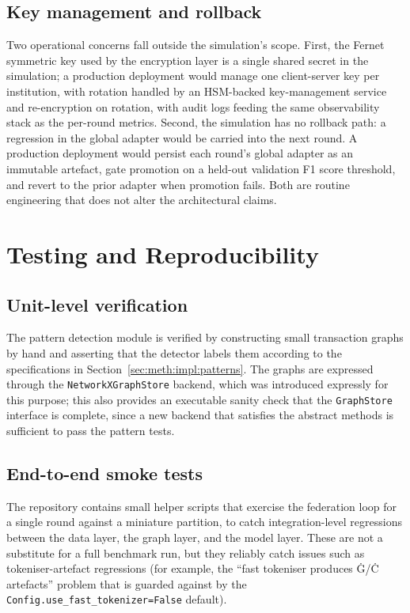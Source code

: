 \documentclass{report}
\begin{document}
\subsection{Key management and rollback}

Two operational concerns fall outside the simulation's scope. First, the Fernet symmetric key used by the encryption layer is a single shared secret in the simulation; a production deployment would manage one client-server key per institution, with rotation handled by an HSM-backed key-management service and re-encryption on rotation, with audit logs feeding the same observability stack as the per-round metrics. Second, the simulation has no rollback path: a regression in the global adapter would be carried into the next round. A production deployment would persist each round's global adapter as an immutable artefact, gate promotion on a held-out validation F1 score threshold, and revert to the prior adapter when promotion fails. Both are routine engineering that does not alter the architectural claims.

\section{Testing and Reproducibility}
\label{sec:meth:testing}

\subsection{Unit-level verification}

The pattern detection module is verified by constructing small transaction graphs by hand and asserting that the detector labels them according to the specifications in Section~\ref{sec:meth:impl:patterns}. The graphs are expressed through the \texttt{NetworkXGraphStore} backend, which was introduced expressly for this purpose; this also provides an executable sanity check that the \texttt{GraphStore} interface is complete, since a new backend that satisfies the abstract methods is sufficient to pass the pattern tests.

\subsection{End-to-end smoke tests}

The repository contains small helper scripts that exercise the federation loop for a single round against a miniature partition, to catch integration-level regressions between the data layer, the graph layer, and the model layer. These are not a substitute for a full benchmark run, but they reliably catch issues such as tokeniser-artefact regressions (for example, the \enquote{fast tokeniser produces Ġ/Ċ artefacts} problem that is guarded against by the \texttt{Config.use\_fast\_tokenizer=False} default).
\end{document}
